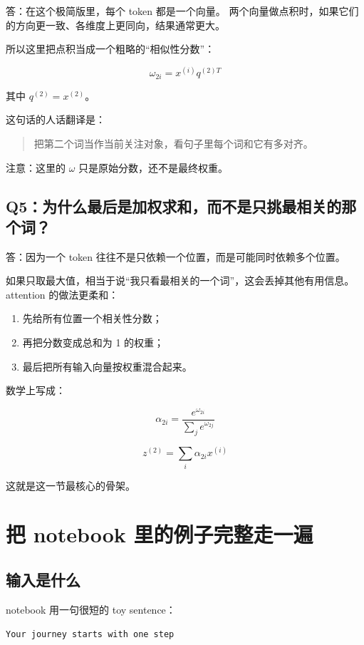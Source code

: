 \documentclass[12pt,a4paper]{ctexart}
\begin{document}
答：在这个极简版里，每个 token 都是一个向量。
两个向量做点积时，如果它们的方向更一致、各维度上更同向，结果通常更大。

所以这里把点积当成一个粗略的``相似性分数''：

\[
\omega_{2i} = x^{(i)} q^{(2)T}
\]

其中 \(q^{(2)} = x^{(2)}\)。

这句话的人话翻译是：

\begin{quote}
把第二个词当作当前关注对象，看句子里每个词和它有多对齐。
\end{quote}

注意：这里的 \(\omega\) 只是原始分数，还不是最终权重。

\subsection{Q5：为什么最后是加权求和，而不是只挑最相关的那个词？}

答：因为一个 token 往往不是只依赖一个位置，而是可能同时依赖多个位置。

如果只取最大值，相当于说``我只看最相关的一个词''，这会丢掉其他有用信息。
attention 的做法更柔和：

\begin{enumerate}[leftmargin=2em]
  \item 先给所有位置一个相关性分数；
  \item 再把分数变成总和为 1 的权重；
  \item 最后把所有输入向量按权重混合起来。
\end{enumerate}

数学上写成：

\[
\alpha_{2i} = \frac{e^{\omega_{2i}}}{\sum_j e^{\omega_{2j}}}
\]

\[
z^{(2)} = \sum_i \alpha_{2i} x^{(i)}
\]

这就是这一节最核心的骨架。

\section{把 notebook 里的例子完整走一遍}

\subsection{输入是什么}

notebook 用一句很短的 toy sentence：

\begin{center}
\texttt{Your journey starts with one step}
\end{center}
\end{document}
